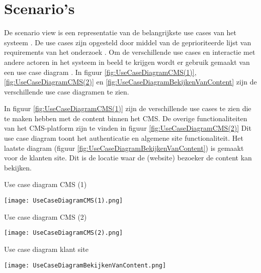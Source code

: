 \section{Scenario's}
De scenario view is een representatie van de belangrijkste use cases van het systeem \parencite{4p1Model}.
De use cases zijn opgesteld door middel van de geprioriteerde lijst van requirements van het onderzoek \parencite{DanteOnderzoek}.
Om de verschillende use cases en interactie met andere actoren in het systeem in beeld te krijgen wordt er gebruik gemaakt van een use case diagram \parencite{UseCaseDiagram}.
In figuur \ref{fig:UseCaseDiagramCMS(1)}, \ref{fig:UseCaseDiagramCMS(2)} en \ref{fig:UseCaseDiagramBekijkenVanContent} zijn de verschillende use case diagramen te zien.

\whitespace[2]
In figuur \ref{fig:UseCaseDiagramCMS(1)} zijn de verschillende use cases te zien die te maken hebben met de content binnen het CMS.
De overige functionaliteiten van het CMS-platform zijn te vinden in figuur \ref{fig:UseCaseDiagramCMS(2)}
Dit use case diagram toont het authenticatie en algemene site functionaliteit.
Het laatste diagram (figuur \ref{fig:UseCaseDiagramBekijkenVanContent}) is gemaakt voor de klanten site.
Dit is de locatie waar de (website) bezoeker de content kan bekijken.

\whitespace[2]
\begin{graphic}
	\captionsetup{type=figure}
	\caption{Use case diagram CMS (1)}
	\texttt{[image: UseCaseDiagramCMS(1).png]}
	\label{fig:UseCaseDiagramCMS(1)}
\end{graphic}

\newpage
\begin{graphic}
	\captionsetup{type=figure}
	\caption{Use case diagram CMS (2)}
	\texttt{[image: UseCaseDiagramCMS(2).png]}
	\label{fig:UseCaseDiagramCMS(2)}
\end{graphic}

\whitespace
\begin{graphic}
	\captionsetup{type=figure}
	\caption{Use case diagram klant site}
	\texttt{[image: UseCaseDiagramBekijkenVanContent.png]}
	\label{fig:UseCaseDiagramBekijkenVanContent}
\end{graphic}
